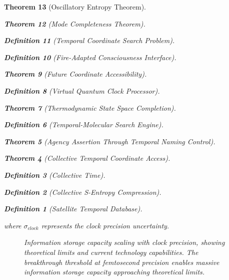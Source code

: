 \documentclass[12pt,a4paper]{article}
\newtheorem{theorem}{Theorem}[section]
\newtheorem{definition}[theorem]{Definition}
\begin{document}
\begin{theorem}[Oscillatory Entropy Theorem]
\begin{theorem}[Mode Completeness Theorem]
\begin{enumerate}
\begin{definition}[Temporal Coordinate Search Problem]
\begin{algorithm}
\begin{definition}[Fire-Adapted Consciousness Interface]
\begin{theorem}[Future Coordinate Accessibility]
\begin{definition}[Virtual Quantum Clock Processor]
\begin{itemize}
\begin{itemize}
\begin{theorem}[Thermodynamic State Space Completion]
\begin{definition}[Temporal-Molecular Search Engine]
\begin{theorem}[Agency Assertion Through Temporal Naming Control]
\begin{remark}
\begin{theorem}[Collective Temporal Coordinate Access]
\begin{definition}[Collective Time]
\begin{definition}[Collective S-Entropy Compression]
\begin{definition}[Satellite Temporal Database]
\begin{algorithm}
\begin{table}[h]
{{where $\sigma_{clock}$ represents the clock precision uncertainty.

\begin{figure}[H]
\centering
{}
\caption{Information storage capacity scaling with clock precision, showing theoretical limits and current technology capabilities. The breakthrough threshold at femtosecond precision enables massive information storage capacity approaching theoretical limits.}
\label{fig:clock_precision_capacity}
\end{figure}

}}
\end{table}
\end{algorithm}
\end{definition}
\end{definition}
\end{definition}
\end{theorem}
\end{remark}
\end{theorem}
\end{definition}
\end{theorem}
\end{itemize}
\end{itemize}
\end{definition}
\end{theorem}
\end{definition}
\end{algorithm}
\end{definition}
\end{enumerate}
\end{theorem}
\end{theorem}
\end{document}
